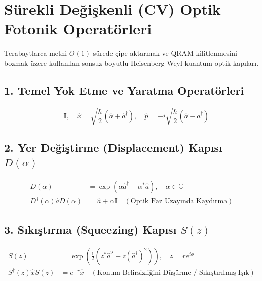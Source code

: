 \documentclass[11pt, a4paper]{article}
\begin{document}
\section{Sürekli Değişkenli (CV) Optik Fotonik Operatörleri}

Terabaytlarca metni $O(1)$ sürede çipe aktarmak ve QRAM kilitlenmesini bozmak üzere kullanılan sonsuz boyutlu Heisenberg-Weyl kuantum optik kapıları.

\subsection{1. Temel Yok Etme ve Yaratma Operatörleri}
\begin{equation}
[\hat{a}, \hat{a}^\dagger] = \mathbf{I}, \quad \hat{x} = \sqrt{\frac{\hbar}{2}}(\hat{a} + \hat{a}^\dagger), \quad \hat{p} = -i\sqrt{\frac{\hbar}{2}}(\hat{a} - \hat{a}^\dagger)
\end{equation}

\subsection{2. Yer Değiştirme (Displacement) Kapısı $D(\alpha)$}
\begin{align}
D(\alpha) &= \exp(\alpha \hat{a}^\dagger - \alpha^* \hat{a}), \quad \alpha \in \mathbb{C} \\
D^\dagger(\alpha) \hat{a} D(\alpha) &= \hat{a} + \alpha \mathbf{I} \quad (\text{Optik Faz Uzayında Kaydırma})
\end{align}

\subsection{3. Sıkıştırma (Squeezing) Kapısı $S(z)$}
\begin{align}
S(z) &= \exp\left( \frac{1}{2}(z^* \hat{a}^2 - z (\hat{a}^\dagger)^2) \right), \quad z = r e^{i\phi} \\
S^\dagger(z) \hat{x} S(z) &= e^{-r} \hat{x} \quad (\text{Konum Belirsizliğini Düşürme / Sıkıştırılmış Işık})
\end{align}
\end{document}
